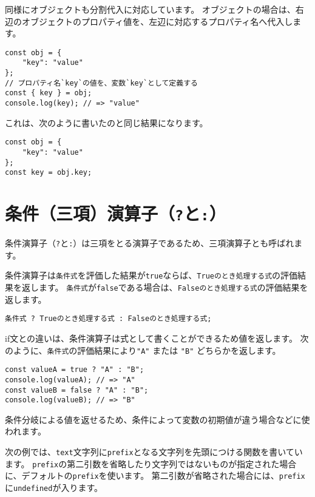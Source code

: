 同様にオブジェクトも分割代入に対応しています。
オブジェクトの場合は、右辺のオブジェクトのプロパティ値を、左辺に対応するプロパティ名へ代入します。

\begin{lstlisting}
const obj = {
    "key": "value"
};
// プロパティ名`key`の値を、変数`key`として定義する
const { key } = obj;
console.log(key); // => "value"
\end{lstlisting}

これは、次のように書いたのと同じ結果になります。

\begin{lstlisting}
const obj = {
    "key": "value"
};
const key = obj.key;
\end{lstlisting}

\hypertarget{ternary-operator}{%
\section{\texorpdfstring{条件（三項）演算子（\texttt{?}と\texttt{:}）}{条件（三項）演算子（?と:）}}\label{ternary-operator}}

条件演算子（\texttt{?}と\texttt{:}）は三項をとる演算子であるため、三項演算子とも呼ばれます。

条件演算子は\texttt{条件式}を評価した結果が\texttt{true}ならば、\texttt{Trueのとき処理する式}の評価結果を返します。
\texttt{条件式}が\texttt{false}である場合は、\texttt{Falseのとき処理する式}の評価結果を返します。

\begin{lstlisting}
条件式 ? Trueのとき処理する式 : Falseのとき処理する式;
\end{lstlisting}

if文との違いは、条件演算子は式として書くことができるため値を返します。
次のように、\texttt{条件式}の評価結果により\texttt{"A"}
または \texttt{"B"} どちらかを返します。

\begin{lstlisting}
const valueA = true ? "A" : "B";
console.log(valueA); // => "A"
const valueB = false ? "A" : "B";
console.log(valueB); // => "B"
\end{lstlisting}

条件分岐による値を返せるため、条件によって変数の初期値が違う場合などに使われます。

次の例では、\texttt{text}文字列に\texttt{prefix}となる文字列を先頭につける関数を書いています。
\texttt{prefix}の第二引数を省略したり文字列ではないものが指定された場合に、デフォルトの\texttt{prefix}を使います。
第二引数が省略された場合には、\texttt{prefix}に\texttt{undefined}が入ります。

